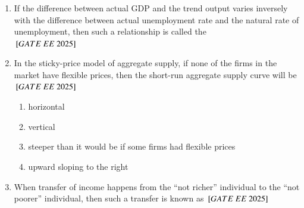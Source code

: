 \documentclass[journal,12pt,onecolumn]{IEEEtran}
\theoremstyle{remark}
\begin{document}
\begin{enumerate}
    \item If the difference between actual GDP and the trend output varies inversely with the difference between actual unemployment rate and the natural rate of unemployment, then such a relationship is called the\\      \hfill $\sbrak{GATE\ EE\ 2025}$
    \begin{enumerate}
      \end{enumerate}

    \item In the sticky-price model of aggregate supply, if none of the firms in the market have flexible prices, then the short-run aggregate supply curve will be
     \hfill $\sbrak{GATE\ EE\ 2025}$
    \begin{enumerate}
        \item horizontal
        \item vertical
        \item steeper than it would be if some firms had flexible prices
        \item upward sloping to the right
  \end{enumerate}
\item When transfer of income happens from the ``not richer'' individual to the ``not poorer'' individual, then such a transfer is known as
\hfill $\sbrak{GATE\ EE\ 2025}$
    \begin{enumerate}
      \end{enumerate}
 

\end{enumerate}
\end{document}
